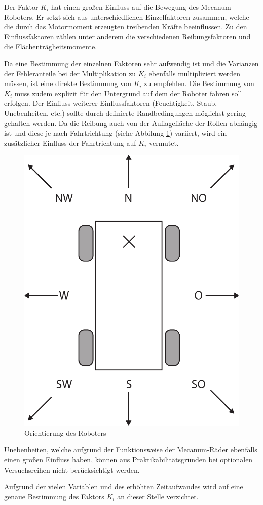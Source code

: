 Der Faktor $K_i$ hat einen großen Einfluss auf die Bewegung des Mecanum-Roboters. Er setzt sich aus unterschiedlichen Einzelfaktoren zusammen, welche die durch das Motormoment erzeugten treibenden Kräfte beeinflussen. Zu den Einflussfaktoren zählen unter anderem die verschiedenen Reibungsfaktoren und die Flächenträgheitsmomente. 

Da eine Bestimmung der einzelnen Faktoren sehr aufwendig ist und die Varianzen der Fehleranteile  bei der Multiplikation zu $K_i$ ebenfalls multipliziert werden müssen, ist eine direkte Bestimmung von $K_i$ zu empfehlen. Die Bestimmung von  $K_i$ muss zudem explizit für den Untergrund auf dem der Roboter fahren soll erfolgen. Der Einfluss weiterer Einflussfaktoren (Feuchtigkeit, Staub, Unebenheiten, etc.) sollte durch definierte Randbedingungen möglichst gering gehalten werden. 
Da die Reibung auch von der Auflagefläche der Rollen abhängig ist und diese je nach Fahrtrichtung (siehe Abbilung \ref{fig:himmel}) variiert, wird ein zusätzlicher Einfluss der Fahrtrichtung auf  $K_i$ vermutet. 

\begin{figure}[H]
    \centering
    \includegraphics[width=.4\textwidth]{Abbildungen/Himmelsrichtungen}
    \caption{Orientierung des Roboters}
    \label{fig:himmel}
  \end {figure}

Unebenheiten, welche aufgrund der Funktionsweise der Mecanum-Räder ebenfalls einen großen Einfluss haben, können aus Praktikabilitätsgründen bei optionalen Versuchsreihen nicht berücksichtigt werden. 

Aufgrund der vielen Variablen und des erhöhten Zeitaufwandes wird auf eine genaue Bestimmung des Faktors $K_i$ an dieser Stelle verzichtet. 












